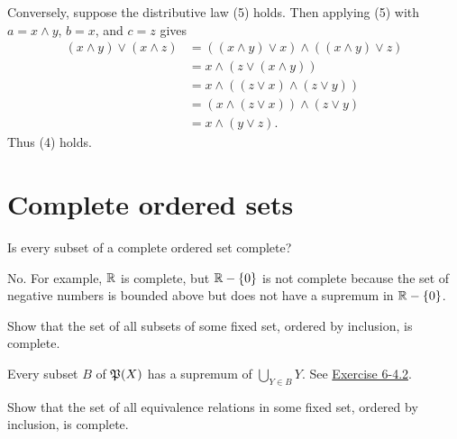 \begin{solution}
Conversely, suppose the distributive law (5) holds. Then applying (5) with $a=x\wedge y$, $b=x$,
and $c=z$ gives
\[
\begin{aligned}
    (x\wedge y)\vee (x\wedge z) &=  ((x\wedge y)\vee x) \wedge ((x\wedge y)\vee z)\\
    &= x \wedge (z\vee (x\wedge y))\\
    &= x \wedge ((z\vee x)\wedge (z\vee y))\\
    &= (x \wedge (z\vee x)) \wedge (z\vee y)\\
    &= x \wedge (y\vee z).
\end{aligned}
\]
Thus (4) holds.
\end{solution}

\section{Complete ordered sets}
\begin{exercise}
Is every subset of a complete ordered set complete?
\end{exercise}

\begin{solution}
No. For example, $\mathbb{R}$ is complete, but $\mathbb{R}-\left\{0\right\}$ is not complete because the set of negative numbers
is bounded above but does not have a supremum in $\mathbb{R}-\left\{0\right\}$.
\end{solution}

\begin{exercise}
Show that the set of all subsets of some fixed set, ordered by inclusion, is complete.
\end{exercise}

\begin{solution}
Every subset $B$ of $\operatorname{\mathfrak{P}}(X)$ has a supremum of $\bigcup_{Y\in B} Y$.
See \hyperref[ex:6-4.2]{Exercise 6-4.2}.
\end{solution}

\begin{exercise}
Show that the set of all equivalence relations in some fixed set, ordered by inclusion,
is complete.
\end{exercise}

